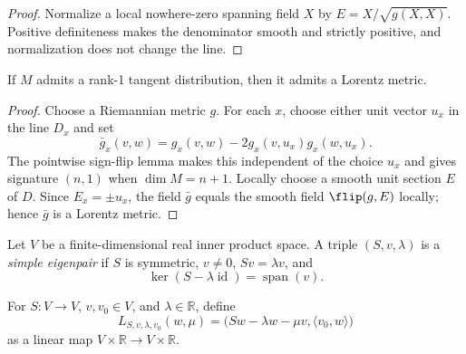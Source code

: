 \begin{proof}

\sketch Normalize a local nowhere-zero spanning field $X$ by
$E=X/\sqrt{g(X,X)}$. Positive definiteness makes the denominator smooth and
strictly positive, and normalization does not change the line.
\end{proof}

\begin{proposition}
\label{prop:lorentz-metric-of-rank-one-distribution}





If $M$ admits a rank-1 tangent distribution, then it admits a Lorentz metric.
\end{proposition}

\begin{proof}

\sketch Choose a Riemannian metric $g$. For each $x$, choose either unit vector
$u_x$ in the line $D_x$ and set
\[
\bar g_x(v,w)=g_x(v,w)-2g_x(v,u_x)g_x(w,u_x).
\]
The pointwise sign-flip lemma makes this independent of the choice $u_x$ and gives
signature $(n,1)$ when $\dim M=n+1$. Locally choose a smooth unit section $E$ of
$D$. Since $E_x=\pm u_x$, the field $\bar g$ equals the smooth field
$\flip(g,E)$ locally; hence $\bar g$ is a Lorentz metric.
\end{proof}

\begin{definition}
\label{def:simple-eigenpair}




Let $V$ be a finite-dimensional real inner product space. A triple
$(S,v,\lambda)$ is a \emph{simple eigenpair} if $S$ is symmetric, $v\ne0$,
$Sv=\lambda v$, and
\[
\ker(S-\lambda\operatorname{id})=\operatorname{span}(v).
\]
\end{definition}

\begin{definition}
\label{def:eigen-linearisation}




For $S\colon V\to V$, $v,v_0\in V$, and $\lambda\in\mathbb R$, define
\[
L_{S,v,\lambda,v_0}(w,\mu)
=\bigl(Sw-\lambda w-\mu v,\langle v_0,w\rangle\bigr)
\]
as a linear map $V\times\mathbb R\to V\times\mathbb R$.
\end{definition}

